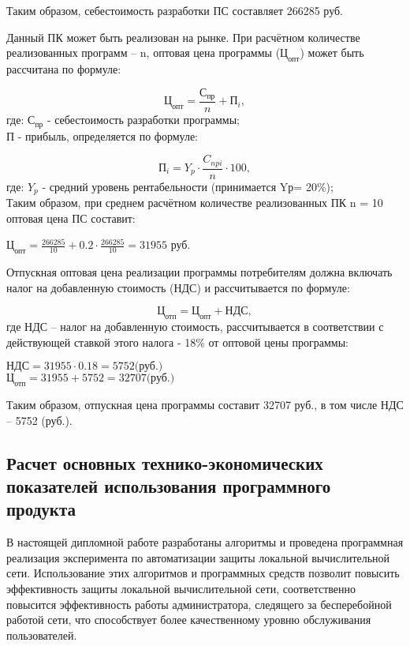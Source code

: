 Таким образом, себестоимость разработки ПС составляет 266285 руб.

Данный ПК может быть реализован на рынке. При расчётном количестве реализованных программ – n, оптовая цена программы
(${\mbox{Ц}_{\mbox{опт}}}$) может быть рассчитана по формуле:

\begin{equation}
\mbox{Ц}_{\mbox{опт}} = \frac{\mbox{С}_{\mbox{пр}}}{n} + \mbox{П}_i,
\end{equation}
где:	${\mbox{С}_{\mbox{пр}}}$ - себестоимость разработки программы; \\
	${\mbox{П}}$ - прибыль, определяется по формуле:

\begin{equation}
\mbox{П}_i = Y_p \cdot \frac{C_{npi}}{n} \cdot 100,
\end{equation}
где:	${Y_p}$ -  средний уровень рентабельности (принимается Yр= 20\%);\\

Таким образом, при среднем расчётном количестве реализованных ПК n = 10 оптовая цена ПС составит: \\
\begin{center}
${\mbox{Ц}_{\mbox{опт}} = \frac{266285}{10} + 0.2 \cdot \frac{266285}{10} = 31955}$ руб. \\
\end{center}

Отпускная оптовая цена реализации программы потребителям должна включать налог на добавленную
стоимость (НДС) и рассчитывается по формуле:

\begin{equation}
\mbox{Ц}_{\mbox{отп}} = \mbox{Ц}_{\mbox{опт}} + \mbox{НДС},
\end{equation}
где НДС – налог на добавленную стоимость,  рассчитывается в соответствии с действующей ставкой этого
налога - 18\% от оптовой цены программы:

\begin{center}
${\mbox{НДС} = 31955 \cdot 0.18 = 5752\mbox{(руб.)}}$ \\
${\mbox{Ц}_{\mbox{отп}} = 31955 + 5752 = 32707 \mbox{(руб.)}}$
\end{center}

Таким образом, отпускная цена программы составит  32707 руб.,  в том числе НДС – 5752 (руб.).

\subsection{Расчет основных технико-экономических показателей использования программного продукта}
В настоящей дипломной работе  разработаны алгоритмы и проведена программная реализация эксперимента по
автоматизации защиты локальной вычислительной сети. Использование этих алгоритмов и программных средств 
позволит повысить эффективность защиты локальной вычислительной сети, соответственно повысится эффективность
работы администратора, следящего за бесперебойной работой сети, что способствует более качественному уровню
обслуживания пользователей.

